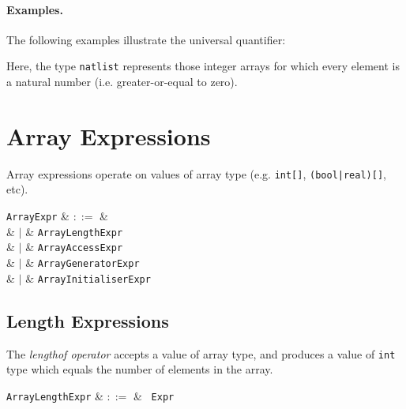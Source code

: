 \paragraph{Examples.}  The following examples illustrate the universal quantifier:



Here, the type \lstinline{natlist} represents those integer arrays for which every element is a natural number (i.e. greater-or-equal to zero).


\section{Array Expressions}
\label{c_expr_array}

Array expressions operate on values of array type (e.g. \lstinline{int[]}, \lstinline{(bool|real)[]}, etc).

\begin{syntax}
  \verb+ArrayExpr+ & $::=$ &\\
  & $|$ & \verb+ArrayLengthExpr+\\
  & $|$ & \verb+ArrayAccessExpr+\\
  & $|$ & \verb+ArrayGeneratorExpr+\\
  & $|$ & \verb+ArrayInitialiserExpr+\\
\end{syntax}


\subsection{Length Expressions}
\label{c_expr_length}

The {\em lengthof operator} accepts a value of array type, and produces a value of \lstinline{int} type which equals the number of elements in the array.

\begin{syntax}
\verb+ArrayLengthExpr+ & $::=$ & \token{|}\ \verb+Expr+\ \token{|}\\
\end{syntax}

